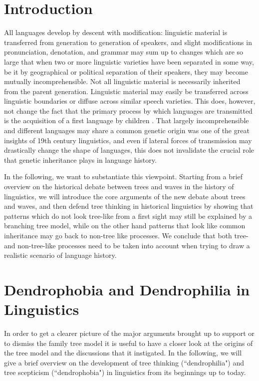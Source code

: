 \documentclass[svgnames,12pt]{scrartcl}
\begin{document}
\section{Introduction}
All languages develop by descent with modification: linguistic material is transferred from
generation to generation of speakers, and slight modifications in pronunciation, denotation, and
grammar may sum up to changes which are so large that when two or more linguistic varieties have
been separated in some way, be it by geographical or political separation of their speakers, they
may become mutually incomprehensible. Not all linguistic material is necessarily inherited from the
parent generation. Linguistic material may easily be transferred across linguistic boundaries or
diffuse across similar speech varieties. This does, however, not change the fact that the primary
process by which languages are transmitted is the acquisition of a first language by children
\citep[61]{Ringe2002}. That largely incomprehensible and different languages may share a common
genetic origin was one of the great insights of 19th century linguistics, and even if lateral forces
of transmission may drastically change the shape of languages, this does not invalidate the crucial
role that genetic inheritance plays in language history.  
 
In the following, we want to substantiate
this viewpoint. Starting from a brief overview on the historical debate between trees and waves in
the history of linguistics, we will introduce the core arguments of the new debate about trees and
waves, and then defend tree thinking in historical linguistics by showing that patterns which do not
look tree-like from a first sight may still be explained by a branching tree model, while on the
other hand patterns that look like common inheritance may go back to non-tree like processes. We
conclude that both tree- and non-tree-like processes need to be taken into account when trying to
draw a realistic scenario of language history. 
\section{Dendrophobia and Dendrophilia in Linguistics}
In order to get a clearer picture of the major arguments brought up to support or to dismiss the
family tree model it is useful to have a closer look at the origins of the tree model and the
discussions that it instigated. In the following, we will give a brief overview on the development
of tree thinking (``dendrophilia") and tree scepticism (``dendrophobia") in linguistics from its
beginnings up to today.
 
\end{document}
